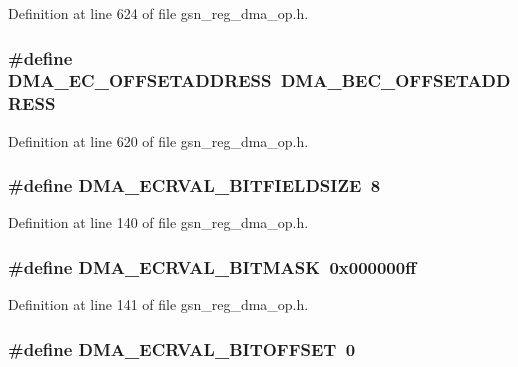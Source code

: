 Definition at line 624 of file gsn\_\-reg\_\-dma\_\-op.h.

\hypertarget{a00547_a39e33436d3c28d4a8b7d8e7072520a5b}{
\subsubsection[{DMA\_\-EC\_\-OFFSETADDRESS}]{\setlength{\rightskip}{0pt plus 5cm}\#define DMA\_\-EC\_\-OFFSETADDRESS~DMA\_\-BEC\_\-OFFSETADDRESS}}
\label{a00547_a39e33436d3c28d4a8b7d8e7072520a5b}


Definition at line 620 of file gsn\_\-reg\_\-dma\_\-op.h.

\hypertarget{a00547_a402e7b3a5891401d10193789541a34cb}{
\subsubsection[{DMA\_\-ECRVAL\_\-BITFIELDSIZE}]{\setlength{\rightskip}{0pt plus 5cm}\#define DMA\_\-ECRVAL\_\-BITFIELDSIZE~8}}
\label{a00547_a402e7b3a5891401d10193789541a34cb}


Definition at line 140 of file gsn\_\-reg\_\-dma\_\-op.h.

\hypertarget{a00547_a4d2ec1d32bbd0155bd23334b293f82ad}{
\subsubsection[{DMA\_\-ECRVAL\_\-BITMASK}]{\setlength{\rightskip}{0pt plus 5cm}\#define DMA\_\-ECRVAL\_\-BITMASK~0x000000ff}}
\label{a00547_a4d2ec1d32bbd0155bd23334b293f82ad}


Definition at line 141 of file gsn\_\-reg\_\-dma\_\-op.h.

\hypertarget{a00547_a16c269acf3f99d66899dd002b91f80d5}{
\subsubsection[{DMA\_\-ECRVAL\_\-BITOFFSET}]{\setlength{\rightskip}{0pt plus 5cm}\#define DMA\_\-ECRVAL\_\-BITOFFSET~0}}
\label{a00547_a16c269acf3f99d66899dd002b91f80d5}


